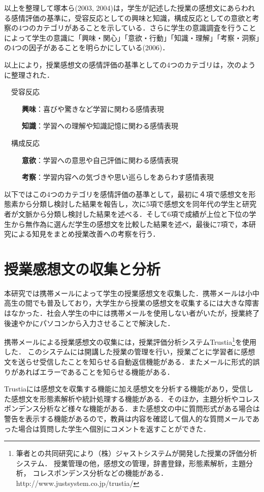 \documentclass[japanese]{jnlp_1.3a}
\begin{document}
以上を整理して塚本ら(2003, 2004)は，学生が記述した授業の感想文にあらわれる感情評価の基準に，受容反応としての興味と知識，構成反応としての意欲と考察の4つのカテゴリがあることを示している．さらに学生の意識調査を行うことによって学生の意識に「興味・関心」「意欲・行動」「知識・理解」「考察・洞察」の4つの因子があることを明らかにしている(2006)．

以上により，授業感想文の感情評価の基準としての4つのカテゴリは，次のように整理された．

\clearpage
　受容反応

　　\textbullet~\textbf{興味}：喜びや驚きなど学習に関わる感情表現

　　\textbullet~\textbf{知識}：学習への理解や知識記憶に関わる感情表現

　構成反応

　　\textbullet~\textbf{意欲}：学習への意思や自己評価に関わる感情表現

　　\textbullet~\textbf{考察}：学習内容への気づきや思い巡らしをあらわす感情表現

以下ではこの4つのカテゴリを感情評価の基準として，最初に４項で感想文を形態素から分類し検討した結果を報告し，次に5項で感想文を同年代の学生と研究者が文脈から分類し検討した結果を述べる．そして6項で成績が上位と下位の学生から無作為に選んだ学生の感想文を比較した結果を述べ，最後に7項で，本研究による知見をまとめ授業改善への考察を行う．

\section{授業感想文の収集と分析}

本研究では携帯メールによって学生の授業感想文を収集した．携帯メールは小中高生の間でも普及しており，大学生から授業の感想文を収集するには大きな障害はなかった．社会人学生の中には携帯メールを使用しない者がいたが，授業終了後速やかにパソコンから入力させることで解決した．

携帯メールによる授業感想文の収集には，授業評価分析システムTrustia\footnote{
	筆者との共同研究により（株）ジャストシステムが開発した授業の評価分析システム．
	授業管理の他，感想文の管理，辞書登録，形態素解析，主題分析，
	コレスポンデンス分析などの機能がある．http://www.justsystem.co.jp/trustia/}を使用した．
このシステムには開講した授業の管理を行い，授業ごとに学習者に感想文を送らせ受信したことを知らせる自動返信機能がある．またメールに形式的誤りがあればエラーであることを知らせる機能がある．

Trustiaには感想文を収集する機能に加え感想文を分析する機能があり，受信した感想文を形態素解析や統計処理する機能がある．そのほか，主題分析やコレスポンデンス分析など様々な機能がある．また感想文の中に質問形式がある場合は警告を表示する機能があるので，教員は内容を確認して個人的な質問メールであった場合は質問した学生へ個別にコメントを返すことができた．
\end{document}
